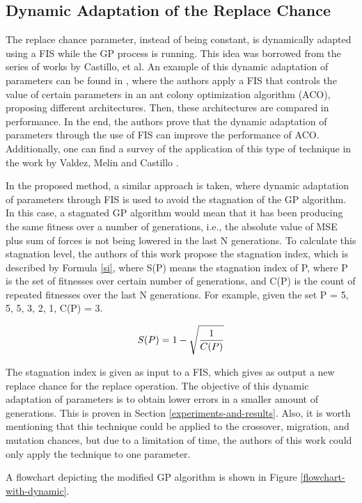 \subsection{Dynamic Adaptation of the Replace Chance}
\label{dynamic-adaptation-of-the-replace-chance}

The replace chance parameter, instead of being constant, is dynamically adapted using a FIS while the GP process is running. This idea was borrowed from the series of works by Castillo, et al. An example of this dynamic adaptation of parameters can be found in \cite{castillo2015new}, where the authors apply a FIS that controls the value of certain parameters in an ant colony optimization algorithm (ACO), proposing different architectures. Then, these architectures are compared in performance. In the end, the authors prove that the dynamic adaptation of parameters through the use of FIS can improve the performance of ACO. Additionally, one can find a survey of the application of this type of technique in the work by Valdez, Melin and Castillo \cite{valdez2014survey}.

In the proposed method, a similar approach is taken, where dynamic adaptation of parameters through FIS is used to avoid the stagnation of the GP algorithm. In this case, a stagnated GP algorithm would mean that it has been producing the same fitness over a number of generations, i.e., the absolute value of MSE plus sum of forces is not being lowered in the last N generations. To calculate this stagnation level, the authors of this work propose the stagnation index, which is described by Formula \ref{si}, where S(P) means the stagnation index of P, where P is the set of fitnesses over certain number of generations, and C(P) is the count of repeated fitnesses over the last N generations. For example, given the set P = {5, 5, 5, 3, 2, 1}, C(P) = 3.

\begin{equation} \label{si}
S(P) = 1 - \sqrt{1 \over C(P)}
\end{equation}

The stagnation index is given as input to a FIS, which gives as output a new replace chance for the replace operation. The objective of this dynamic adaptation of parameters is to obtain lower errors in a smaller amount of generations. This is proven in Section \ref{experiments-and-results}. Also, it is worth mentioning that this technique could be applied to the crossover, migration, and mutation chances, but due to a limitation of time, the authors of this work could only apply the technique to one parameter.

A flowchart depicting the modified GP algorithm is shown in Figure \ref{flowchart-with-dynamic}.